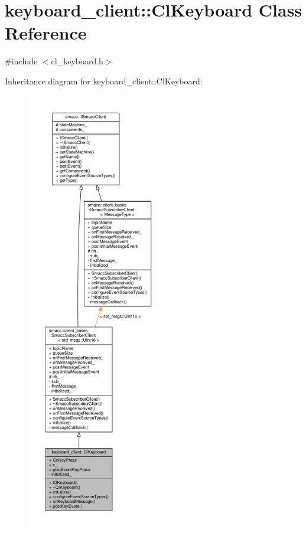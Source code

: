 \hypertarget{classkeyboard__client_1_1ClKeyboard}{}\section{keyboard\+\_\+client\+:\+:Cl\+Keyboard Class Reference}
\label{classkeyboard__client_1_1ClKeyboard}


{\ttfamily \#include $<$cl\+\_\+keyboard.\+h$>$}



Inheritance diagram for keyboard\+\_\+client\+:\+:Cl\+Keyboard\+:\nopagebreak
\begin{figure}[H]
\begin{center}
\leavevmode
\includegraphics[height=550pt]{classkeyboard__client_1_1ClKeyboard__inherit__graph}
\end{center}
\end{figure}


